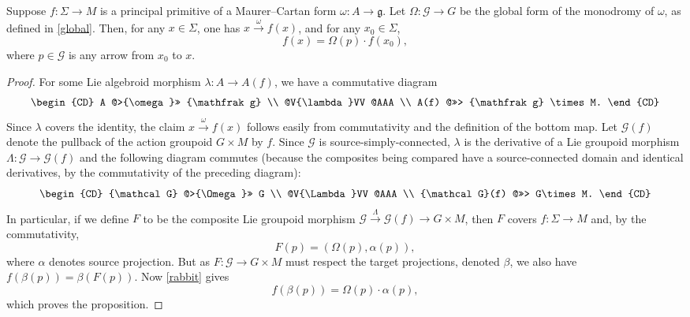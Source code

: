 \begin{Proposition}\label{uniquenessP}
 Suppose $f \colon \Sigma \rightarrow M$ is a principal primitive of
 a Maurer--Cartan form $\omega \colon A \rightarrow {\mathfrak g} $.
 Let $\Omega \colon {\mathcal G} \rightarrow G$ be the global form of
 the monodromy of $\omega $, as defined in \eqref{global}. Then, for
 any $x \in \Sigma $, one has $x\xrightarrow{\omega}f(x)$, and for
 any $x_0\in \Sigma $,
 \begin{equation*} f(x)=\Omega(p)\cdot f(x_0),
 \end{equation*} where $p \in {\mathcal G} $ is any arrow from $x_0$
to $x$.
\end{Proposition}
\begin{proof} For some Lie algebroid morphism $\lambda \colon A
\rightarrow A(f)$, we have a commutative diagram
 \begin{equation*}
 \begin{CD} A @>{\omega }>> {\mathfrak g} \\ @V{\lambda}VV @AAA \\
A(f) @>>> {\mathfrak g} \times M.
 \end{CD}
 \end{equation*}
 Since $\lambda$ covers the identity, the claim
$x\xrightarrow{\omega}f(x)$ follows easily from commutativity and the
definition of the bottom map. Let ${\mathcal G}(f)$ denote the
pullback of the action groupoid $G \times M$ by $f$. Since ${\mathcal
G} $ is source-simply-connected, $\lambda$ is the derivative of a Lie
groupoid morphism $\Lambda \colon {\mathcal G} \rightarrow {\mathcal
G}(f)$ and the following diagram commutes (because the composites
being compared have a source-connected domain and identical
derivatives, by the commutativity of the preceding diagram):
 \begin{equation*}
 \begin{CD} {\mathcal G} @>{\Omega }>> G \\ @V{\Lambda}VV @AAA \\
{\mathcal G}(f) @>>> G\times M.
 \end{CD}
 \end{equation*}
 In particular, if we define $F$ to be the composite
Lie groupoid morphism ${\mathcal G}\xrightarrow{\Lambda}{\mathcal
G}(f)\rightarrow G \times M$, then $F$ covers $f \colon \Sigma
\rightarrow M$ and, by the commutativity,
\begin{equation}
F(p)=(\Omega(p),\alpha(p)),\label{rabbit}
\end{equation} where $\alpha $ denotes source projection. But as $F
\colon {\mathcal G} \rightarrow G \times M$ must respect the target
projections, denoted $\beta$, we also have
$f(\beta(p))=\beta(F(p))$. Now \eqref{rabbit} gives
\begin{equation*} f(\beta(p))=\Omega(p) \cdot \alpha(p),
\end{equation*} which proves the proposition.
\end{proof}
